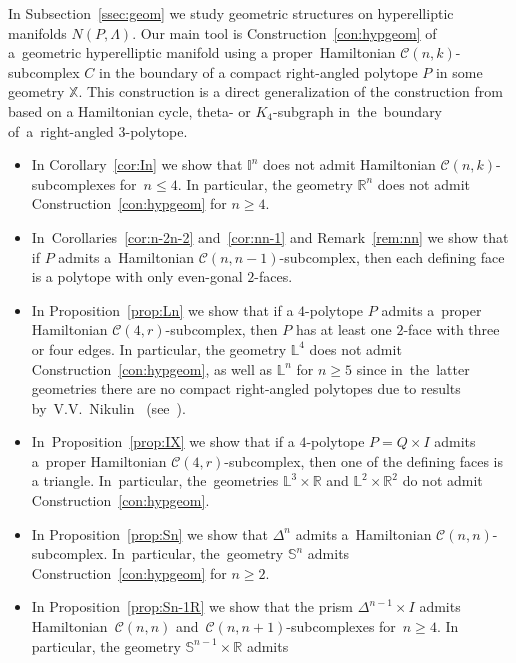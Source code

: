 \documentclass[12pt]{amsart}
\theoremstyle{definition}
\theoremstyle{remark}
\begin{document}
In Subsection~\ref{ssec:geom} we study geometric structures on hyperelliptic manifolds $N(P,\Lambda)$.
Our main tool is Construction~\ref{con:hypgeom} of a~geometric hyperelliptic manifold using 
a proper~Hamiltonian $\mathcal{C}(n,k)$-subcomplex $C$ in the boundary of a compact right-angled polytope $P$
in some geometry $\mathbb X$. This construction is a direct generalization of the construction
from \cite{M90, VM99M, VM99S2} based on a Hamiltonian cycle, theta- or $K_4$-subgraph 
in~the~boundary of~a~right-angled $3$-polytope. 
\begin{itemize}
\item In Corollary~\ref{cor:In} we show that $\mathbb I^n$
does not admit Hamiltonian \linebreak $\mathcal{C}(n,k)$-subcomplexes for~$n\leqslant 4$. In particular, the geometry 
$\mathbb R^n$ does not admit Construction~\ref{con:hypgeom} for $n\geqslant 4$.
\item In~Corollaries~\ref{cor:n-2n-2} 
and~\ref{cor:nn-1} and Remark~\ref{rem:nn} we show that if $P$ admits a~Hamiltonian 
$\mathcal{C}(n,n-1)$-subcomplex, then each defining
face is a polytope with only even-gonal $2$-faces. 
\item In Proposition~\ref{prop:Ln} we show
that if a $4$-polytope $P$ admits a~proper Hamiltonian $\mathcal{C}(4,r)$-subcomplex, then $P$
has at least one $2$-face with three or four edges. In particular, the geometry $\mathbb L^4$
does not admit Construction~\ref{con:hypgeom}, as well as $\mathbb L^n$ for $n\geqslant 5$
since in~the~latter geometries there are no compact right-angled polytopes due to results by~V.V.~Nikulin~\cite{N82} 
(see~\cite{V17}). 
\item In~Proposition~\ref{prop:IX} we show that if a $4$-polytope $P=Q\times I$
admits a~proper Hamiltonian $\mathcal{C}(4,r)$-subcomplex, then one of the defining faces is a triangle.
In~particular, the~geometries $\mathbb L^3\times \mathbb R$ and $\mathbb L^2\times \mathbb R^2$ do not admit
Construction~\ref{con:hypgeom}. 
\item In Proposition~\ref{prop:Sn} we show that $\Delta^n$ admits 
a~Hamiltonian $\mathcal{C}(n,n)$-subcomplex. In~particular, the~geometry $\mathbb S^n$ admits 
Construction~\ref{con:hypgeom} for $n\geqslant 2$. 
\item In Proposition~\ref{prop:Sn-1R} we show that 
the prism $\Delta^{n-1}\times I$ admits Hamiltonian~$\mathcal{C}(n,n)$ and~$\mathcal{C}(n,n+1)$-subcomplexes 
for~$n\geqslant 4$. In particular, the geometry $\mathbb S^{n-1}\times\mathbb R$ admits 

\end{itemize}
\end{document}
